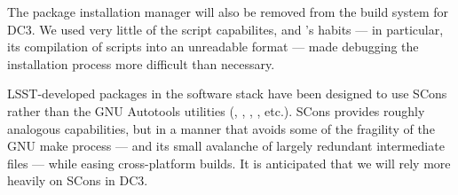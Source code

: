 The  package installation manager will also be removed from the
build system for DC3. We used very little of the  script
capabilites, and 's habits --- in particular, its compilation of
 scripts into an unreadable format --- made debugging the
installation process more difficult than necessary.

LSST-developed packages in the software stack have been designed to use
SCons rather than the GNU Autotools utilities (, ,
, , etc.).  SCons provides roughly analogous
capabilities, but in a manner that avoids some of the fragility of the
GNU make process --- and its small avalanche of largely redundant intermediate 
files --- while easing cross-platform builds. It is anticipated that we will 
rely more heavily on SCons in DC3.


